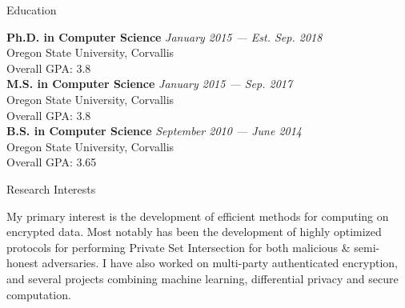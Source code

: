 \documentclass{resume} %
\begin{document}

\begin{rSection}{Education}

{\bf Ph.D. in Computer Science} \hfill {\em January 2015 --- Est. Sep. 2018} \\ 
Oregon State University, Corvallis\smallskip \\
Overall GPA: 3.8\\ 


{\bf M.S. in Computer Science} \hfill {\em January 2015 --- Sep. 2017} \\ 
Oregon State University, Corvallis\smallskip \\
Overall GPA: 3.8\\ 


{\bf B.S. in Computer Science} \hfill {\em September 2010 --- June 2014} \\ 
Oregon State University, Corvallis\smallskip \\
Overall GPA: 3.65\\ 

\end{rSection}



\begin{rSection}{Research Interests}
	
My primary interest is the development of efficient methods for computing on encrypted data. Most notably has been the development of highly optimized protocols for performing  Private Set Intersection for both malicious \& semi-honest adversaries. I have also worked on multi-party authenticated encryption, and several projects combining machine learning, differential privacy and secure computation.
	
\end{rSection}

\end{document}
